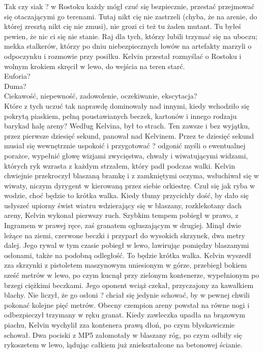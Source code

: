 \documentclass[../MAIN.tex]{subfiles}
\begin{document}
Tak czy siak ? w Rostoku każdy mógł czuć się bezpiecznie, przestać przejmować się otaczającymi go terenami. Tutaj nikt cię nie zastrzeli (chyba, że na arenie, do której zresztą nikt cię nie zmusi), nie grozi ci też tu żaden mutant. Tu byłeś pewien, że nic ci się nie stanie.
Raj dla tych, którzy lubili trzymać się na uboczu; mekka stalkerów, którzy po dniu niebezpiecznych łowów na artefakty marzyli o odpoczynku i rozmowie przy posiłku.
Kelvin przestał rozmyślać o Rostoku i wolnym krokiem skręcił w lewo, do wejścia na teren starć.\\
Euforia?\\
Duma?\\
Ciekawość, niepewność, zadowolenie, oczekiwanie, ekscytacja?\\
Które z tych uczuć tak naprawdę dominowały nad innymi, kiedy wchodziło się pokrytą piaskiem, pełną poustawianych beczek, kartonów i innego rodzaju barykad halę areny?
Według Kelvina, był to strach.
Ten zawsze i bez wyjątku, przez pierwsze dziesięć sekund, panował nad Kelvinem. Przez te dziesięć sekund musiał się wewnętrznie uspokoić i przygotować ? odgonić myśli o ewentualnej porażce, wypełnić głowę wizjami zwycięstwa, chwały i wiwatującymi widzami, których ryk wzrasta z każdym strzałem, który padł podczas walki.
Kelvin chwiejnie przekroczył blaszaną bramkę i z zamkniętymi oczyma, wsłuchiwał się w wiwaty, niczym dyrygent w kierowaną przez siebie orkiestrę. Czuł się jak ryba w wodzie, choć będzie to krótka walka.
Kiedy tłumy przycichły dość, by dało się usłyszeć upiorny świst wiatru wdzierający się w blaszany, rozklekotany dach areny, Kelvin wykonał pierwszy ruch.
Szybkim tempem pobiegł w prawo, z Ingramem w prawej ręce, zaś granatem ogłuszającym w drugiej. Minął dwie leżące na ziemi, czerwone beczki i przyparł do wysokich skrzynek, dwa metry dalej. Jego rywal w tym czasie pobiegł w lewo, lawirując pomiędzy blaszanymi osłonami, także na podobną odległość.
To będzie krótka walka.
Kelvin wyszedł zza skrzynki z pistoletem maszynowym uniesionym w górze, przebiegł bokiem sześć metrów w lewo, po czym kucnął przy zielonym kontenerze, wypełnionym po brzegi ciężkimi beczkami. Jego oponent wciąż czekał, przyczajony za kawałkiem blachy. Nie liczył, że go osłoni ? chciał się jedynie schować, by w pewnej chwili pokonać kolejne pięć metrów.
Obecny czempion areny powstał na równe nogi i odbezpieczył trzymany w ręku granat. Kiedy zawleczka upadła na brązowym piachu, Kelvin wychylił zza kontenera prawą dłoń, po czym błyskawicznie schował.
Dwa pociski z MP5 załomotały w blaszany róg, po czym odbiły się rykoszetem w lewo, lądując całkiem już zniekształcone na betonowej ścianie.
\end{document}

